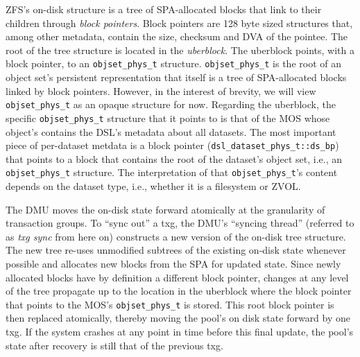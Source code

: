 \documentclass[12pt,a4paper,twoside]{book}
\begin{document}
ZFS's on-disk structure is a tree of SPA-allocated blocks that link to their children through \textit{block pointers}.
Block pointers are 128 byte sized structures that, among other metadata, contain the size, checksum and DVA of the pointee.
The root of the tree structure is located in the \textit{uberblock}.
The uberblock points, with a block pointer, to an \lstinline{objset_phys_t} structure.
\lstinline{objset_phys_t} is the root of an object set's persistent representation that itself is a tree of SPA-allocated blocks linked by block pointers.
However, in the interest of brevity, we will view \lstinline{objset_phys_t} as an opaque structure for now.
Regarding the uberblock, the specific \lstinline{objset_phys_t} structure that it points to is that of the MOS whose object's contains the DSL's metadata about all datasets.
The most important piece of per-dataset metdata is a block pointer (\lstinline{dsl_dataset_phys_t::ds_bp}) that points to a block that contains the root of the dataset's object set, i.e., an \lstinline{objset_phys_t} structure.
The interpretation of that \lstinline{objset_phys_t}'s content depends on the dataset type, i.e., whether it is a filesystem or ZVOL.

The DMU moves the on-disk state forward atomically at the granularity of transaction groups.
To ``sync out'' a txg, the DMU's ``syncing thread'' (referred to as \textit{txg sync} from here on) constructs a new version of the on-disk tree structure.
The new tree re-uses unmodified subtrees of the existing on-disk state whenever possible and allocates new blocks from the SPA for updated state.
Since newly allocated blocks have by definition a different block pointer, changes at any level of the tree propagate up to the location in the uberblock where the block pointer that points to the MOS's \lstinline{objset_phys_t} is stored.
This root block pointer is then replaced atomically, thereby moving the pool's on disk state forward by one txg.
If the system crashes at any point in time before this final update, the pool's state after recovery is still that of the previous txg.
\end{document}
